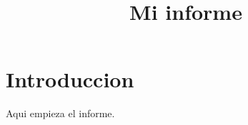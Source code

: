 \documentclass{article}
\title{Mi informe}
\author{}
\date{}
\begin{document}
\maketitle

\section{Introduccion}
Aqui empieza el informe.
\end{document}
